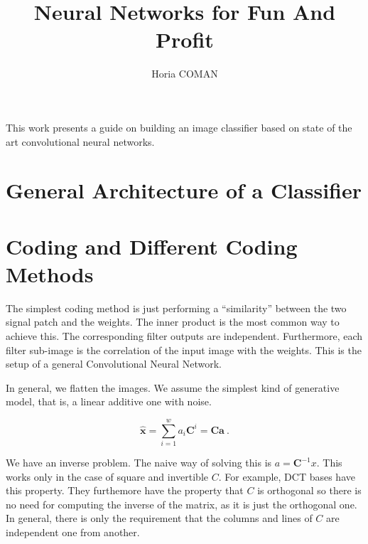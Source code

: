 \documentclass[12pt,a4paper,oneside,english]{UPBThesis}
\begin{document}
\author{Horia COMAN}

\title{Neural Networks for Fun And Profit}



\beforepreface
\listoffigures
\listoftables
{}
\afterpreface


This work presents a guide on building an image classifier based on state of the art convolutional neural networks.

\chapter{General Architecture of a Classifier}

\chapter{Coding and Different Coding Methods}

The simplest coding method is just performing a ``similarity'' between the two signal patch and the weights. The inner product is the most common way to achieve this. The corresponding filter outputs are independent. Furthermore, each filter sub-image is the correlation of the input image with the weights. This is the setup of a general Convolutional Neural Network.

In general, we flatten the images. We assume the simplest kind of generative model, that is, a linear additive one with noise.

\begin{equation}
\hat{\textbf{x}} = \sum_{i=1}^w {a_i \textbf{C}^i} = \textbf{C}\textbf{a}~.
\end{equation}

We have an inverse problem. The naive way of solving this is $a = \textbf{C}^{-1}x$. This works only in the case of square and invertible $C$. For example, DCT bases have this property. They furthemore have the property that $C$ is orthogonal so there is no need for computing the inverse of the matrix, as it is just the orthogonal one. In general, there is only the requirement that the columns and lines of $C$ are independent one from another.
\end{document}
